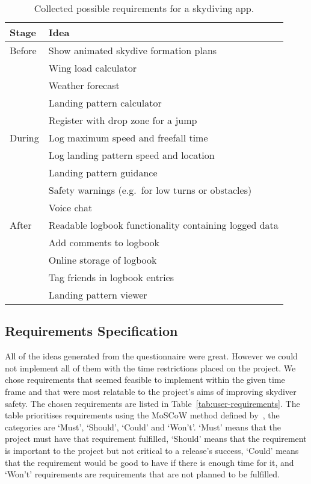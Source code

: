 \begin{table*}[ht]
  \centering
  \caption{Collected possible requirements for a skydiving app.}\label{tab:user-ideas}
  \begin{tabular}{@{}ll@{}}
    \toprule
    \textbf{Stage}  & \textbf{Idea} \\
    \midrule
    Before & Show animated skydive formation plans \\
           & Wing load calculator \\
           & Weather forecast \\
           & Landing pattern calculator \\
           & Register with drop zone for a jump \vspace{2mm} \\
    During & Log maximum speed and freefall time \\
           & Log landing pattern speed and location \\
           & Landing pattern guidance \\
           & Safety warnings (e.g.\ for low turns or obstacles) \\
           & Voice chat \vspace{2mm} \\
    After  & Readable logbook functionality containing logged data \\
           & Add comments to logbook \\
           & Online storage of logbook \\
           & Tag friends in logbook entries \\
           & Landing pattern viewer \\
    \bottomrule
  \end{tabular}
\end{table*}

\subsection{Requirements Specification}
All of the ideas generated from the questionnaire were great. However we could not implement all of them with the time restrictions placed on the project. We chose requirements that seemed feasible to implement within the given time frame and that were most relatable to the project's aims of improving skydiver safety. The chosen requirements are listed in Table~\vref{tab:user-requirements}. The table prioritises requirements using the MoSCoW method defined by~\citeauthor{clegg_case_1994}, the categories are `Must', `Should', `Could' and `Won't'. `Must' means that the project must have that requirement fulfilled, `Should' means that the requirement is important to the project but not critical to a release's success, `Could' means that the requirement would be good to have if there is enough time for it, and `Won't' requirements are requirements that are not planned to be fulfilled.

